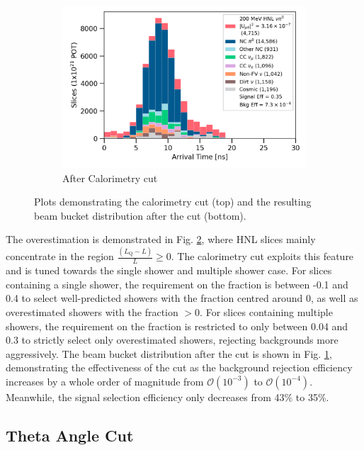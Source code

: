 \begin{figure}[ht!]
\begin{subfigure}[b]{0.495\textwidth}
            \includegraphics[width=\textwidth]{beam_bucket_postopt0}
            \caption{After Calorimetry cut}%
	    \label{fig:bb_opt0}
        \end{subfigure}
        \caption{
		Plots demonstrating the calorimetry cut (top) and the resulting beam bucket distribution after the cut (bottom). 
	}
        \label{fig:opt0_cut}
\end{figure}

The overestimation is demonstrated in Fig. \ref{fig:opt0_cut}, where HNL slices mainly concentrate in the region $\frac{(L_{\mathrm{Q}} - L)}{L} \geq 0$. 
The calorimetry cut exploits this feature and is tuned towards the single shower and multiple shower case.
For slices containing a single shower, the requirement on the fraction is between -0.1 and 0.4 to select well-predicted showers with the fraction centred around 0, as well as overestimated showers with the fraction $> 0$. 
For slices containing multiple showers, the requirement on the fraction is restricted to only between 0.04 and 0.3 to strictly select only overestimated showers, rejecting backgrounds more aggressively.
The beam bucket distribution after the cut is shown in Fig. \ref{fig:bb_opt0}, demonstrating the effectiveness of the cut as the background rejection efficiency increases by a whole order of magnitude from $\mathcal{O}(10^{-3})$ to $\mathcal{O}(10^{-4})$. 
Meanwhile, the signal selection efficiency only decreases from 43\% to 35\%.

\subsection{Theta Angle Cut}

